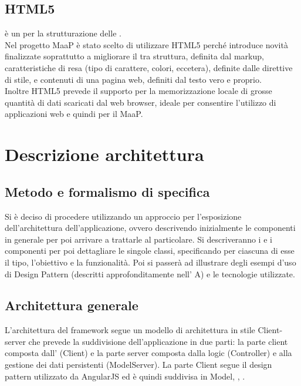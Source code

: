 \subsection{HTML5}
 è un  per la strutturazione delle .\\
Nel progetto MaaP è stato scelto di utilizzare HTML5 perché introduce novità finalizzate soprattutto a migliorare il  tra struttura, definita dal markup, caratteristiche di resa (tipo di carattere, colori, eccetera), definite dalle direttive di stile, e contenuti di una pagina web, definiti dal testo vero e proprio.\\
Inoltre HTML5 prevede il supporto per la memorizzazione locale di grosse quantità di dati scaricati dal web browser, ideale per consentire l'utilizzo di applicazioni web e quindi per il  MaaP.

\newpage
\section{Descrizione architettura}
\subsection{Metodo e formalismo di specifica}
Si è deciso di procedere utilizzando un approccio  per l'esposizione dell'architettura dell'applicazione, ovvero descrivendo inizialmente le componenti in generale per poi arrivare a trattarle al particolare.
Si descriveranno i  e i componenti per poi dettagliare le singole classi, specificando per ciascuna di esse il tipo, l'obiettivo e la funzionalità. Poi si passerà ad illustrare degli esempi d'uso di Design Pattern (descritti approfonditamente nell' A) e le tecnologie utilizzate.


\subsection{Architettura generale}
L'architettura del framework segue un modello di architettura in stile Client-server che prevede la suddivisione dell'applicazione  in due parti: la parte client composta dall'  (Client) e la parte server composta dalla  logic (Controller) e alla gestione dei dati persistenti (ModelServer). La parte Client segue il design pattern  utilizzato da AngularJS ed è quindi suddivisa in Model, , .\\

